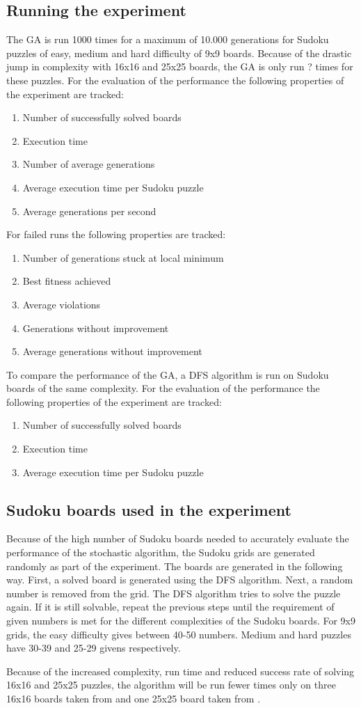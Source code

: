 \subsection{Running the experiment}
The GA is run 1000 times for a maximum of 10.000 generations for Sudoku puzzles of easy, medium and hard difficulty of 9x9 boards. Because of the drastic jump in complexity with 16x16 and 25x25 boards, the GA is only run ? times for these puzzles. For the evaluation of the performance the following properties of the experiment are tracked:
\begin{enumerate}
	\item Number of successfully solved boards
	\item Execution time
	\item Number of average generations
	\item Average execution time per Sudoku puzzle
	\item Average generations per second
\end{enumerate}

For failed runs the following properties are tracked:
\begin{enumerate}
	\item Number of generations stuck at local minimum
	\item Best fitness achieved
	\item Average violations
	\item Generations without improvement
	\item Average generations without improvement
\end{enumerate}

To compare the performance of the GA, a DFS algorithm is run on Sudoku boards of the same complexity. For the evaluation of the performance the following properties of the experiment are tracked:
\begin{enumerate}
	\item Number of successfully solved boards
	\item Execution time
	\item Average execution time per Sudoku puzzle
\end{enumerate}

\subsection{Sudoku boards used in the experiment}
Because of the high number of Sudoku boards needed to accurately evaluate the performance of the stochastic algorithm, the Sudoku grids are generated randomly as part of the experiment. The boards are generated in the following way. 
First, a solved board is generated using the DFS algorithm. Next, a random number is removed from the grid. The DFS algorithm tries to solve the puzzle again. If it is still solvable, repeat the previous steps until the requirement of given numbers is met for the different complexities of the Sudoku boards. For 9x9 grids, the easy difficulty gives between 40-50 numbers. Medium and hard puzzles have 30-39 and 25-29 givens respectively.

Because of the increased complexity, run time and reduced success rate of solving 16x16 and 25x25 puzzles, the algorithm will be run fewer times only on three 16x16 boards taken from \cite{Sudoku16} and one 25x25 board taken from \cite{Sudoku25}.